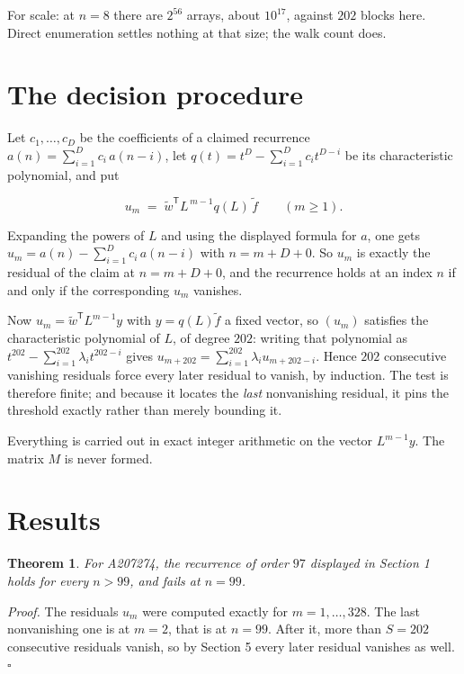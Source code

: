 \documentclass[11pt]{article}
\newtheorem{theorem}{Theorem}
\theoremstyle{definition}
\begin{document}
For scale: at $n = 8$ there are $2^{56}$ arrays, about $10^{17}$, against $202$ blocks here. Direct enumeration settles nothing at that size; the walk count does.

\section{The decision procedure}

Let $c_1,\dots,c_D$ be the coefficients of a claimed recurrence $a(n) = \sum_{i=1}^{D} c_i\,a(n-i)$, let $q(t) = t^{D} - \sum_{i=1}^{D} c_i t^{D-i}$ be its characteristic polynomial, and put

\[u_m \;=\; \tilde w^{\mathsf T} L^{\,m-1} q(L)\,\tilde f \qquad (m \ge 1).\]

Expanding the powers of $L$ and using the displayed formula for $a$, one gets $u_m = a(n) - \sum_{i=1}^{D} c_i\,a(n-i)$ with $n = m + D + 0$. So $u_m$ is exactly the residual of the claim at $n = m + D + 0$, and the recurrence holds at an index $n$ if and only if the corresponding $u_m$ vanishes.

Now $u_m = \tilde w^{\mathsf T} L^{m-1} y$ with $y = q(L)\tilde f$ a fixed vector, so $(u_m)$ satisfies the characteristic polynomial of $L$, of degree $202$: writing that polynomial as $t^{202} - \sum_{i=1}^{202} \lambda_i t^{202-i}$ gives $u_{m+202} = \sum_{i=1}^{202} \lambda_i u_{m+202-i}$. Hence $202$ consecutive vanishing residuals force every later residual to vanish, by induction. The test is therefore finite; and because it locates the {\itshape last} nonvanishing residual, it pins the threshold exactly rather than merely bounding it.

Everything is carried out in exact integer arithmetic on the vector $L^{m-1}y$. The matrix $M$ is never formed.

\section{Results}

\begin{theorem} For A207274, the recurrence of order $97$ displayed in Section 1 holds for every $n > 99$, and fails at $n = 99$.\end{theorem}

{\itshape Proof.} The residuals $u_m$ were computed exactly for $m = 1,\dots,328$. The last nonvanishing one is at $m = 2$, that is at $n = 99$. After it, more than $S = 202$ consecutive residuals vanish, so by Section 5 every later residual vanishes as well. $\square$
\end{document}

